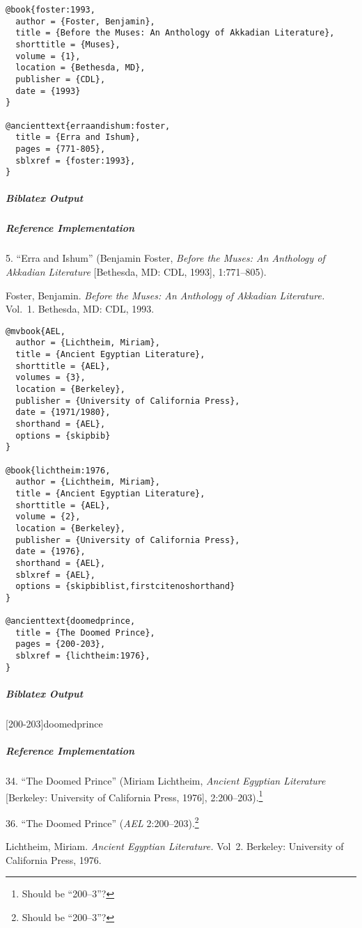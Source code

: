 \documentclass[a4paper]{article}
\newenvironment{biboutput}{%
  \subparagraph{Biblatex Output}
}{\color{black}}
\newenvironment{refimp}{%
  \subparagraph{Reference Implementation}
  \color{reference-colour}
  \rm
}{\par\color{black}}
\begin{document}
\medskip

\begin{lstlisting}
@book{foster:1993,
  author = {Foster, Benjamin},
  title = {Before the Muses: An Anthology of Akkadian Literature},
  shorttitle = {Muses},
  volume = {1},
  location = {Bethesda, MD},
  publisher = {CDL},
  date = {1993}
}

@ancienttext{erraandishum:foster,
  title = {Erra and Ishum},
  pages = {771-805},
  sblxref = {foster:1993},
}
\end{lstlisting}

\begin{biboutput}
\end{biboutput}

\begin{refimp}
  5. “Erra and Ishum” (Benjamin Foster, \emph{Before the Muses: An Anthology
  of Akkadian Literature} [Bethesda, MD: CDL, 1993], 1:771–805).
  
  \hangindent\bibindent Foster, Benjamin. \emph{Before the Muses: An Anthology of
  Akkadian Literature.} Vol.~1. Bethesda, MD: CDL, 1993.
\end{refimp}

\medskip

\begin{lstlisting}
@mvbook{AEL,
  author = {Lichtheim, Miriam},
  title = {Ancient Egyptian Literature},
  shorttitle = {AEL},
  volumes = {3},
  location = {Berkeley},
  publisher = {University of California Press},
  date = {1971/1980},
  shorthand = {AEL},
  options = {skipbib}
}

@book{lichtheim:1976,
  author = {Lichtheim, Miriam},
  title = {Ancient Egyptian Literature},
  shorttitle = {AEL},
  volume = {2},
  location = {Berkeley},
  publisher = {University of California Press},
  date = {1976},
  shorthand = {AEL},
  sblxref = {AEL},
  options = {skipbiblist,firstcitenoshorthand}
}

@ancienttext{doomedprince,
  title = {The Doomed Prince},
  pages = {200-203},
  sblxref = {lichtheim:1976},
}
\end{lstlisting}

\begin{biboutput}
  [200-203]{doomedprince}
\end{biboutput}

\begin{refimp}
  34. “The Doomed Prince” (Miriam Lichtheim, \emph{Ancient Egyptian
  Literature} [Berkeley: University of California Press, 1976],
  2:200–203).\footnote{Should be “200–3”?}
  
  36. “The Doomed Prince” (\emph{AEL} 2:200–203).\footnote{Should be “200–3”?}
  
  \hangindent \bibindent Lichtheim, Miriam. \emph{Ancient Egyptian
  Literature.} Vol~2. Berkeley: University of California Press, 1976.

\end{refimp}
\end{document}
